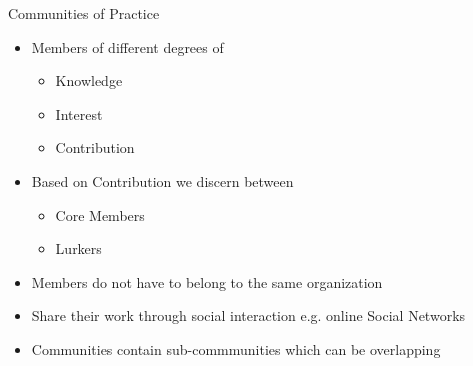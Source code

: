 \begin{frame}{Communities of Practice}
  \begin{itemize}
    \item Members of different degrees of
          \begin{itemize}
            \item Knowledge %
            \item Interest %
            \item Contribution
          \end{itemize}
    \item Based on Contribution we discern between
          \begin{itemize}
            \item Core Members %
            \item Lurkers %
          \end{itemize}
    \item Members do not have to belong to the same organization
    \item Share their work through social interaction e.g. online Social Networks %
    \item Communities contain sub-commmunities which can be overlapping
  \end{itemize}
\end{frame}


